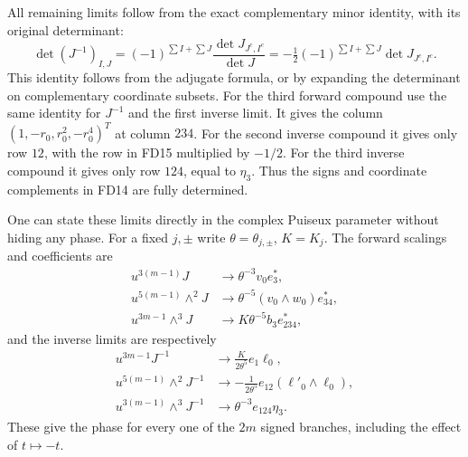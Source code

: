 All remaining limits follow from the exact complementary
minor identity, with its original determinant:
\[
 \det(J^{-1})_{I,J}
 =(-1)^{\sum I+\sum J}\frac{\det J_{J^c,I^c}}{\det J}
 =-\tfrac12(-1)^{\sum I+\sum J}\det J_{J^c,I^c}.
 \tag{FD17}
\]
This identity follows from the adjugate formula, or by
expanding the determinant on complementary coordinate
subsets. For the third forward compound use the same
identity for \(J^{-1}\) and the first inverse limit.
It gives the column \((1,-r_0,r_0^2,-r_0^4)^T\)
at column \(234\). For the second inverse compound
it gives only row \(12\), with the row in FD15 multiplied
by \(-1/2\). For the third inverse compound it gives
only row \(124\), equal to \(\eta_3\). Thus the signs
and coordinate complements in FD14 are fully determined.

One can state these limits directly in the complex Puiseux
parameter without hiding any phase. For a fixed \(j,\pm\)
write \(\theta=\theta_{j,\pm}\), \(K=K_j\). The forward
scalings and coefficients are
\[
\begin{aligned}
 u^{3(m-1)}J&\longrightarrow\theta^{-3}v_0e_3^*,\\
 u^{5(m-1)}\wedge^2J&\longrightarrow
                     \theta^{-5}(v_0\wedge w_0)e_{34}^*,\\
 u^{3m-1}\wedge^3J&\longrightarrow K\theta^{-5}b_3e_{234}^*,
\end{aligned}\tag{FD18}
\]
and the inverse limits are respectively
\[
\begin{aligned}
 u^{3m-1}J^{-1}&\longrightarrow
                         \frac{K}{2\theta^5}e_1\ell_0,\\
 u^{5(m-1)}\wedge^2J^{-1}&\longrightarrow
                         -\frac1{2\theta^5}e_{12}
                                      (\ell'_0\wedge\ell_0),\\
 u^{3(m-1)}\wedge^3J^{-1}&\longrightarrow
                         \theta^{-3}e_{124}\eta_3.
\end{aligned}\tag{FD19}
\]
These give the phase for every one of the \(2m\) signed
branches, including the effect of \(t\mapsto-t\).

